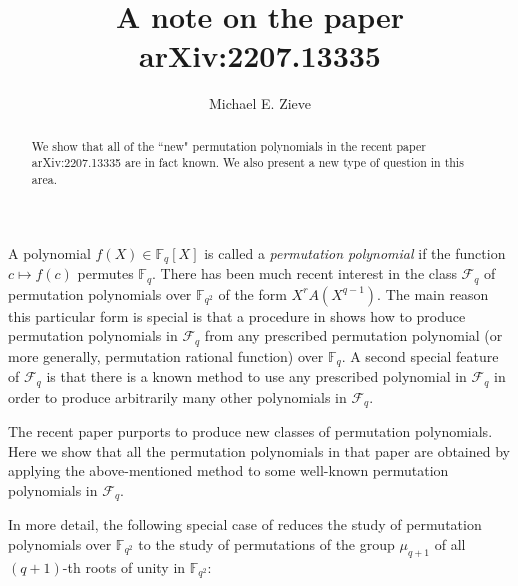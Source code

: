 \documentclass[11pt]{amsart}
\theoremstyle{definition}
\newcommand{\F}{\mathbb{F}}
\begin{document}
\title{A note on the paper arXiv:2207.13335}

\author{Michael E. Zieve}



\begin{abstract}
We show that all of the ``new" permutation polynomials in the
recent paper arXiv:2207.13335 are in fact known.  We also present a new type of question in this area.
\end{abstract}

\maketitle



A polynomial $f(X)\in\F_q[X]$ is called a \emph{permutation polynomial} if the function $c\mapsto f(c)$ permutes $\F_q$.  There has been much recent interest in the class $\mathcal F_q$ of permutation polynomials over $\F_{q^2}$ of the form $X^r A(X^{q-1})$.
The main reason this particular form is special is that a procedure in \cite{ZR} shows how to produce permutation polynomials in $\mathcal F_q$ from any prescribed permutation polynomial (or more generally, permutation rational function) over $\F_q$.  A second special feature of $\mathcal F_q$ is that there is a known method to use any prescribed polynomial in $\mathcal F_q$ in order to produce arbitrarily many other polynomials in $\mathcal F_q$.

The recent paper \cite{SGZWL} purports to produce new classes of permutation polynomials.  Here we show that all the permutation polynomials in that paper are obtained by applying the above-mentioned method to some well-known permutation polynomials in $\mathcal F_q$.

In more detail, the following special case of \cite[Lemma~1.2]{Zlem} reduces the study of permutation polynomials over $\F_{q^2}$ to the study of permutations of the group $\mu_{q+1}$ of all $(q+1)$-th roots of unity in $\F_{q^2}$:
\end{document}
